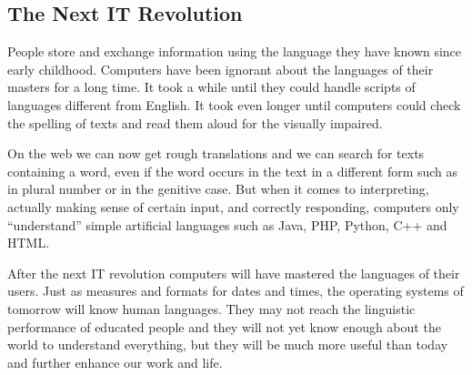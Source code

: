 \documentclass[10pt, plain]{../../metanetpaper}
\begin{document}

\begin{multicols}{2}
\subsection{The Next IT Revolution}
\label{sec:introduction-vision}

People store and exchange information using the language they have known since early childhood. Computers have been ignorant about the languages of their masters for a long time. It took a while until they could handle scripts of languages different from English. It took even longer until computers could check the spelling of texts and read them aloud for the visually impaired.
 
On the web we can now get rough translations and we can search for texts containing a word, even if the word occurs in the text in a different form such as in plural number or in the genitive case. But when it comes to interpreting, actually making sense of certain input, and correctly responding, computers only “understand” simple artificial languages such as Java, PHP, Python, C++ and HTML.
 
After the next IT revolution computers will have mastered the languages of their users. Just as measures and formats for dates and times, the operating systems of tomorrow will know human languages. They may not reach the linguistic performance of educated people and they will not yet know enough about the world to understand everything, but they will be much more useful than today and further enhance our work and life.

%
%


\end{multicols}
\end{document}
